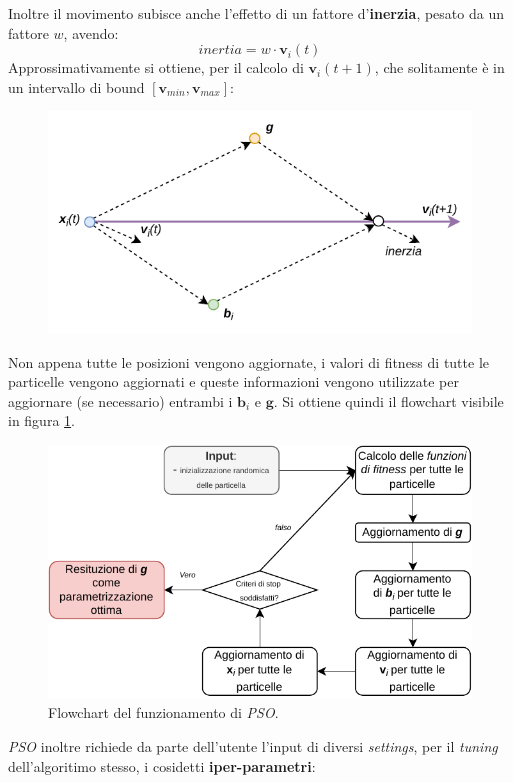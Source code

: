 \documentclass[a4paper,12pt, oneside]{book}
\begin{document}
Inoltre il movimento subisce anche l'effetto di un fattore d'\textbf{inerzia},
pesato da un fattore $w$, avendo:
\[inertia = w\cdot \mathbf{v}_i(t)\]
Approssimativamente si ottiene, per il calcolo di $\mathbf{v}_i(t+1)$, che
solitamente è in un intervallo di bound $[\mathbf{v}_{min}, \mathbf{v}_{max}]$:
\begin{figure}[H]
  \centering
  \includegraphics[scale = 0.9]{img/pso.pdf}
\end{figure}
Non appena tutte le posizioni vengono aggiornate, i valori di fitness di tutte
le particelle vengono aggiornati e queste informazioni vengono utilizzate per
aggiornare (se necessario) entrambi i $\mathbf{b}_i$ e $\mathbf{g}$. Si ottiene
quindi il flowchart visibile in figura \ref{fig:pso}.
\begin{figure}
  \centering
  \includegraphics[scale = 0.9]{img/pso2.pdf}
  \caption{Flowchart del funzionamento di \textit{PSO}.}
  \label{fig:pso}
\end{figure}
\textit{PSO} inoltre richiede da parte dell'utente l'input di diversi
\textit{settings}, per il \textit{tuning} dell'algoritimo stesso, i cosidetti \textbf{iper-parametri}:
\end{document}

